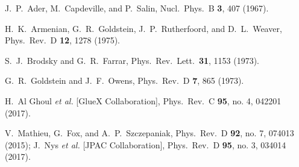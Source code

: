 \documentclass[aps,prc,twocolumn,floatfix,showpacs,preprintnumbers,amsmath,amssymb,superscriptaddress,linenumbers]{revtex4-1}
\begin{document}
\begin{thebibliography}{99}

  J.~P.~Ader, M.~Capdeville, and P.~Salin,
  Nucl.\ Phys.\ B {\bf 3}, 407 (1967).

  H.~K.~Armenian, G.~R.~Goldstein, J.~P.~Rutherfoord, and D.~L.~Weaver,
  Phys.\ Rev.\ D {\bf 12}, 1278 (1975).

  S.~J.~Brodsky and G.~R.~Farrar,
  Phys.\ Rev.\ Lett.\  {\bf 31}, 1153 (1973).

  G.~R.~Goldstein and J.~F.~Owens,
  Phys.\ Rev.\ D {\bf 7}, 865 (1973).

  H.~Al Ghoul {\it et al.} [GlueX Collaboration],
  Phys.\ Rev.\ C {\bf 95}, no. 4, 042201 (2017).

  V.~Mathieu, G.~Fox, and A.~P.~Szczepaniak,
  Phys.\ Rev.\ D {\bf 92}, no. 7, 074013 (2015);
  J.~Nys {\it et al.} [JPAC Collaboration],
  Phys.\ Rev.\ D {\bf 95}, no. 3, 034014 (2017).


\end{thebibliography}
\end{document}

